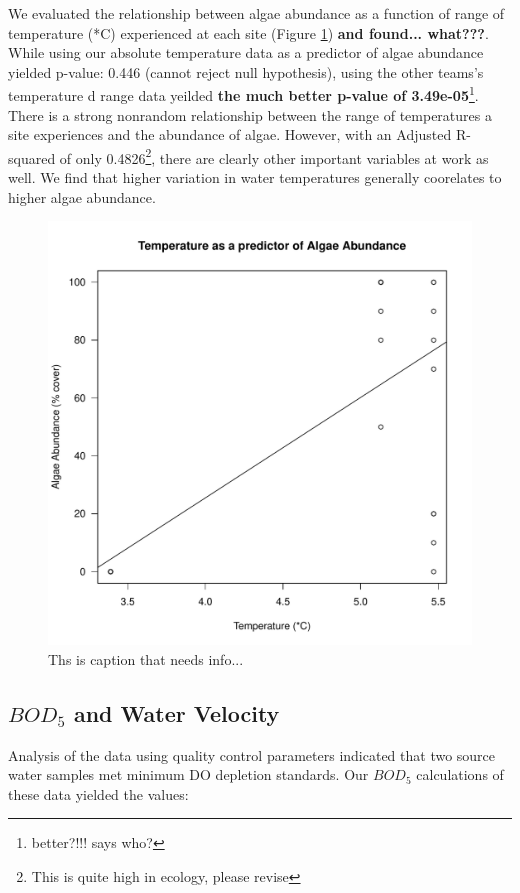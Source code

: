 \documentclass{article}\usepackage[]{graphicx}\usepackage[]{color}
\makeatletter
\def\maxwidth{ %
  \ifdim\Gin@nat@width>\linewidth
    \linewidth
  \else
    \Gin@nat@width
  \fi
}
\newenvironment{knitrout}{}{} %
\makeatother
\begin{document}
We evaluated the relationship between algae abundance as a function of range of temperature (*C) experienced at each site (Figure \ref{fig:tempalgae}) \textbf{and found... what???}. While using our absolute temperature data as a predictor of algae abundance yielded p-value: 0.446 (cannot reject null hypothesis), using the other teams's temperature d range data yeilded \textbf{the much better p-value of 3.49e-05}\footnote{better?!!! says who?}. There is a strong nonrandom relationship between the range of temperatures a site experiences and the abundance of algae. However, with an Adjusted R-squared of only 0.4826\footnote{This is quite high in ecology, please revise}, there are clearly other important variables at work as well. We find that higher variation in water temperatures generally coorelates to higher algae abundance. 
\begin{figure}[!ht]
\begin{knitrout}
\color{fgcolor}
\includegraphics[width=\maxwidth]{figure/unnamed-chunk-5-1} 

\end{knitrout}
\caption{Ths is caption that needs info...}
\label{fig:tempalgae}
\end{figure}

\subsection{$BOD_5$ and Water Velocity}
Analysis of the data using quality control parameters indicated that two source water samples met minimum DO depletion standards. Our $BOD_5$ calculations of these data yielded the values:
\end{document}
